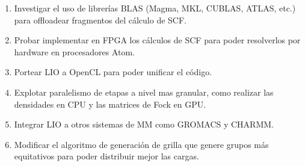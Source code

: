 \begin{enumerate}
  \item Investigar el uso de librer\'ias BLAS (Magma, MKL, CUBLAS, ATLAS, etc.) para offloadear fragmentos del
    c\'alculo de SCF.
  \item Probar implementar en FPGA los c\'alculos de SCF para poder resolverlos por hardware en procesadores
    Atom.
  \item Portear LIO a OpenCL para poder unificar el c\'odigo.
  \item Explotar paralelismo de etapas a nivel mas granular, como realizar las densidades en CPU y las matrices
    de Fock en GPU.
  \item Integrar LIO a otros sistemas de MM como GROMACS y CHARMM.
  \item Modificar el algoritmo de generaci\'on de grilla que genere grupos m\'as equitativos para poder
    distribuir mejor las cargas.

\end{enumerate}
